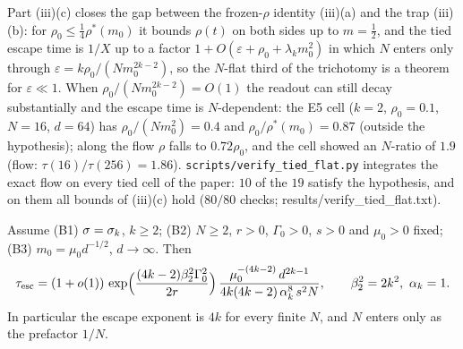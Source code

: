 \begin{remark}\label{rem:tiedflat}
Part (iii)(c) closes the gap between the frozen-$\rho$ identity (iii)(a) and the trap (iii)(b): for $\rho_0\le\frac14\rho^*(m_0)$ it bounds $\rho(t)$ on both
sides up to $m=\frac12$, and the tied escape time is $1/X$ up to a factor $1+O(\varepsilon+\rho_0+\lambda_km_0^2)$ in which $N$ enters only through
$\varepsilon=k\rho_0/(Nm_0^{2k-2})$, so the $N$-flat third of the trichotomy is a theorem for $\varepsilon\ll1$. When $\rho_0/(Nm_0^{2k-2})=O(1)$ the readout can still
decay substantially and the escape time is $N$-dependent: the E5 cell ($k=2$, $\rho_0=0.1$, $N=16$, $d=64$) has $\rho_0/(Nm_0^2)=0.4$ and
$\rho_0/\rho^*(m_0)=0.87$ (outside the hypothesis); along the flow $\rho$ falls to $0.72\rho_0$, and the cell showed an $N$-ratio of $1.9$
(flow: $\tau(16)/\tau(256)=1.86$). \texttt{scripts/verify\_tied\_flat.py} integrates the exact flow on every tied cell of the paper: $10$ of the $19$
satisfy the hypothesis, and on them all bounds of (iii)(c) hold ($80/80$ checks; results/verify\_tied\_flat.txt).
\end{remark}

\begin{theorem}\label{thm:B}
Assume (B1) $\sigma=\sigma_k$, $k\ge2$; (B2) $N\ge2$, $r>0$, $\Gamma_0>0$, $s>0$ and $\mu_0>0$ fixed; (B3) $m_0=\mu_0d^{-1/2}$, $d\to\infty$. Then
\[
\tau_{\rm esc}=(1+o(1))\,\exp\!\Big(\frac{(4k-2)\beta_2^2\Gamma_0^2}{2r}\Big)\,\frac{\mu_0^{-(4k-2)}\,d^{2k-1}}{4k(4k-2)\,\alpha_k^8\,s^2N},
\qquad\beta_2^2=2k^2,\ \alpha_k=1 .
\]
In particular the escape exponent is $4k$ for every finite $N$, and $N$ enters only as the prefactor $1/N$.
\end{theorem}

